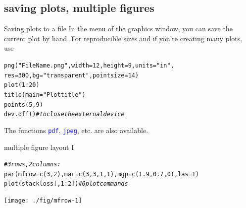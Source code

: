 \documentclass[xcolor=table,       handout,    xcolor=dvipsnames]{beamer}\usepackage[]{graphicx}\usepackage[]{color}
\makeatletter
\newcommand{\hlnum}[1]{\textcolor[rgb]{0,0,0}{#1}}
\newcommand{\hlstr}[1]{\textcolor[rgb]{0.545,0.137,0.137}{#1}}
\newcommand{\hlcom}[1]{\textcolor[rgb]{0,0.392,0}{\textit{#1}}}
\newcommand{\hlopt}[1]{\textcolor[rgb]{0,0,0}{#1}}
\newcommand{\hlstd}[1]{\textcolor[rgb]{0,0,0}{#1}}
\newcommand{\hlkwc}[1]{\textcolor[rgb]{1,0,1}{#1}}
\newcommand{\hlkwd}[1]{\textcolor[rgb]{0,0,1}{#1}}
\newenvironment{kframe}{%
 \def\at@end@of@kframe{}%
 \ifinner\ifhmode%
  \def\at@end@of@kframe{\end{minipage}}%
  \begin{minipage}{\columnwidth}%
 \fi\fi%
 \def\FrameCommand##1{\hskip\@totalleftmargin \hskip-\fboxsep
 \colorbox{shadecolor}{##1}\hskip-\fboxsep
     \hskip-\linewidth \hskip-\@totalleftmargin \hskip\columnwidth}%
 \MakeFramed {\advance\hsize-\width
   \@totalleftmargin\z@ \linewidth\hsize
   \@setminipage}}%
 {\par\unskip\endMakeFramed%
 \at@end@of@kframe}
\newenvironment{knitrout}{}{} %
\newcommand{\rcode}[1]{\texttt{\textcolor{Blue}{#1}}} %
\makeatother
\begin{document}
\subsection{saving plots, multiple figures}

\begin{frame}[fragile]{Saving plots to a file}
In the menu of the graphics window, you can save the current plot by hand.
For reproducible sizes and if you're creating many plots, use
\pause
\begin{knitrout}
\color{fgcolor}\begin{kframe}
\begin{alltt}
\hlkwd{png}\hlstd{(}\hlstr{"FileName.png"}\hlstd{,} \hlkwc{width}\hlstd{=}\hlnum{12}\hlstd{,} \hlkwc{height}\hlstd{=}\hlnum{9}\hlstd{,} \hlkwc{units}\hlstd{=}\hlstr{"in"}\hlstd{,}
           \hlkwc{res}\hlstd{=}\hlnum{300}\hlstd{,} \hlkwc{bg}\hlstd{=}\hlstr{"transparent"}\hlstd{,} \hlkwc{pointsize}\hlstd{=}\hlnum{14}\hlstd{)}
  \hlkwd{plot}\hlstd{(}\hlnum{1}\hlopt{:}\hlnum{20}\hlstd{)}
  \hlkwd{title}\hlstd{(}\hlkwc{main}\hlstd{=}\hlstr{"Plot title"}\hlstd{)}
  \hlkwd{points}\hlstd{(}\hlnum{5}\hlstd{,}\hlnum{9}\hlstd{)}
\hlkwd{dev.off}\hlstd{()} \hlcom{# to close the external device}
\end{alltt}
\end{kframe}
\end{knitrout}
\pause
The functions \rcode{pdf}, \rcode{jpeg}, etc. are also available.
\end{frame}


\begin{frame}[fragile]{multiple figure layout I}
\vspace{-1em}
\begin{knitrout}
\color{fgcolor}\begin{kframe}
\begin{alltt}
\hlcom{# 3 rows, 2 columns:}
\hlkwd{par}\hlstd{(}\hlkwc{mfrow}\hlstd{=}\hlkwd{c}\hlstd{(}\hlnum{3}\hlstd{,}\hlnum{2}\hlstd{),} \hlkwc{mar}\hlstd{=}\hlkwd{c}\hlstd{(}\hlnum{3}\hlstd{,}\hlnum{3}\hlstd{,}\hlnum{1}\hlstd{,}\hlnum{1}\hlstd{),} \hlkwc{mgp}\hlstd{=}\hlkwd{c}\hlstd{(}\hlnum{1.9}\hlstd{,} \hlnum{0.7}\hlstd{,} \hlnum{0}\hlstd{),} \hlkwc{las}\hlstd{=}\hlnum{1}\hlstd{)}
\hlkwd{plot}\hlstd{(stackloss[ ,}\hlnum{1}\hlopt{:}\hlnum{2}\hlstd{])} \hlcom{# 6 plot commands}
\end{alltt}
\end{kframe}

{\centering \texttt{[image: ./fig/mfrow-1]} 

}



\end{knitrout}
\end{frame}
\end{document}
